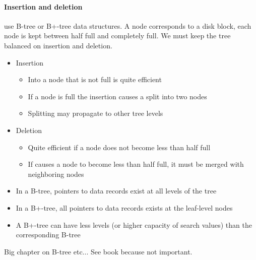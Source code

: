 \begin{itemize}
\paragraph{Insertion and deletion} use B-tree or B+-tree data structures. A node corresponds to a disk block, each node is kept between half full and completely full. We must keep the tree balanced on insertion and deletion.

\begin{itemize}
    \item Insertion
    \begin{itemize}
        \item Into a node that is not full is quite efficient
        \item If a node is full the insertion causes a split into
two nodes
        \item Splitting may propagate to other tree levels
    \end{itemize}
    \item Deletion
    \begin{itemize}
        \item Quite efficient if a node does not become less
than half full
        \item If causes a node to become less than half full,
it must be merged with neighboring nodes
    \end{itemize}
\end{itemize}

\begin{itemize}
    \item In a B-tree, pointers to data records exist
at all levels of the tree
    \item In a B+-tree, all pointers to data records
exists at the leaf-level nodes
    \item A B+-tree can have less levels (or higher
capacity of search values) than the
corresponding B-tree
\end{itemize}

Big chapter on B-tree etc... See book because not important.

\end{itemize}